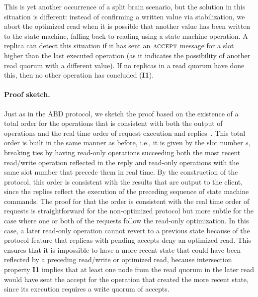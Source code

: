 This is yet another occurrence of a split brain scenario, but
the solution in this situation is different: instead of
confirming a written value via stabilization, we abort the
optimized read when it is possible that another value has been
written to the state machine, falling back to reading using a
state machine operation. A replica can detect this situation if
it has sent an $\textsc{accept}$ message for a slot
higher than the last executed operation (as it indicates the
possibility of another read quorum with a different value). If no
replicas in a read quorum have done this, then no other operation
has concluded (\textbf{I1}). 

\paragraph{Proof sketch.}
Just as in the \ac{ABD} protocol, we sketch the proof based on
the existence of a total order for the operations that is
consistent with both the output of operations and the real time
order of request execution and replies~\cite{nancy-book}. This
total order is built in the same manner as before, i.e., it is
given by the slot number $s$, breaking ties by having read-only
operations succeeding both the most recent read/write operation
reflected in the reply and read-only operations with the
same slot number that precede them in real time. By the
construction of the protocol, this order is consistent with the
results that are output to the client, since the replies reflect
the execution of the preceding sequence of state machine commands.
The proof for that the order is consistent with
the real time order of requests is straightforward for the
non-optimized protocol but more subtle for the case where one or
both of the requests follow the read-only optimization.
In this case, a later read-only operation cannot revert to a
previous state because of the protocol feature that replicas with
pending accepts deny an optimized read.  This ensures that
it is impossible to have a more recent state
that could have been reflected by a preceding read/write or
optimized read, because intersection property \textbf{I1} implies
that at least one node from the read quorum in the later read
would have sent the accept for the operation that created the
more recent state, since its execution requires a write quorum of
accepts.


